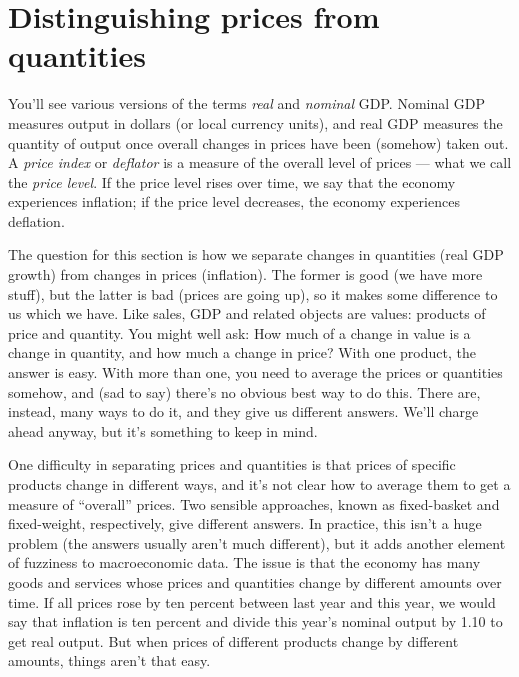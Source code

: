\section{Distinguishing prices from quantities}


You'll see various versions of the terms {\it real\/} and {\it nominal\/} GDP.
Nominal GDP measures output in dollars (or local currency units),
and real GDP measures the quantity of output once overall changes in prices have been
(somehow) taken out.
A {\it price index\/} or {\it deflator\/} is a measure of the
overall level of prices --- what we call the {\it price level\/}.
If the price level rises over time, we say that the economy experiences
inflation; if the price level decreases, the economy experiences
deflation.

The question for this section is how we separate changes in quantities
(real GDP growth) from changes in prices (inflation).
The former is good (we have more stuff), but the latter is bad (prices are going up),
so it makes some difference to us which we have.
Like sales,
GDP and related objects are values: products of price and quantity.
You might well ask:  How much of a change in value is a change
in quantity, and how much a change in price?
With one product, the answer is easy.
With more than one, you need to average the prices or quantities somehow,
and (sad to say) there's no obvious best way to do this.
There are, instead, many ways to do it, and they give us
different answers.
We'll charge ahead anyway, but it's something to keep in mind.


One difficulty in separating prices and quantities
is that prices of specific products change in different ways, and it's not clear how to
average them to get a measure of ``overall'' prices. Two sensible
approaches, known as fixed-basket and fixed-weight, respectively,
give different answers. In practice, this isn't a huge problem (the
answers usually aren't much different), but it adds another
element of fuzziness to macroeconomic data. The issue is that the
economy has many goods and services whose prices and quantities
change by different amounts over time. If all prices rose by ten percent
between last year and this year, we would say that inflation is ten percent and
divide this year's nominal output by 1.10 to get real output. But
when prices of different products change by different amounts,
things aren't that easy.

